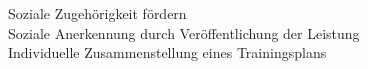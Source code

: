Soziale Zugehörigkeit fördern \\
Soziale Anerkennung durch Veröffentlichung der Leistung \\
Individuelle Zusammenstellung eines Trainingsplans \\
